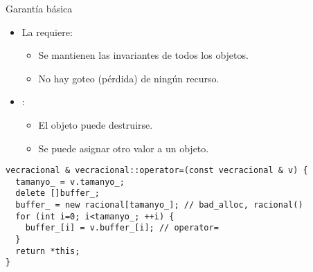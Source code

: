 \begin{frame}[t,fragile]{Garantía básica}
\begin{itemize}
  \item La  requiere:
    \begin{itemize}
      \item Se mantienen las invariantes de todos los objetos.
      \item No hay goteo (pérdida) de ningún recurso.
    \end{itemize}

  \item {}:
    \begin{itemize}
      \item El objeto puede destruirse.
      \item Se puede asignar otro valor a un objeto.
    \end{itemize}
\end{itemize}

\begin{lstlisting}
vecracional & vecracional::operator=(const vecracional & v) {
  tamanyo_ = v.tamanyo_;
  delete []buffer_;
  buffer_ = new racional[tamanyo_]; // bad_alloc, racional()
  for (int i=0; i<tamanyo_; ++i) {
    buffer_[i] = v.buffer_[i]; // operator=
  }
  return *this;
}
\end{lstlisting}
\end{frame}

